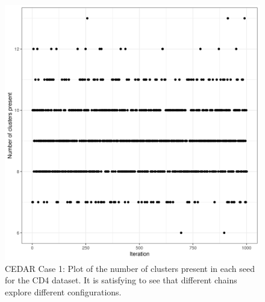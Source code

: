 \documentclass[14pt]{extarticle} %
\begin{document}
	\begin{figure}[h]
		\centering
		\includegraphics[scale=0.75]{Images/Biology_data/Set_250/All_datasets/Cluster_series_plots/CD4.png}
		\caption{CEDAR Case 1: Plot of the number of clusters present in each seed for the CD4 dataset. It is satisfying to see that different chains explore different configurations.}
		\label{fig:results:cedar_1:mdi_cd4_number_clusters_plot}
	\end{figure}
	
	\newpage
	
\end{document}
